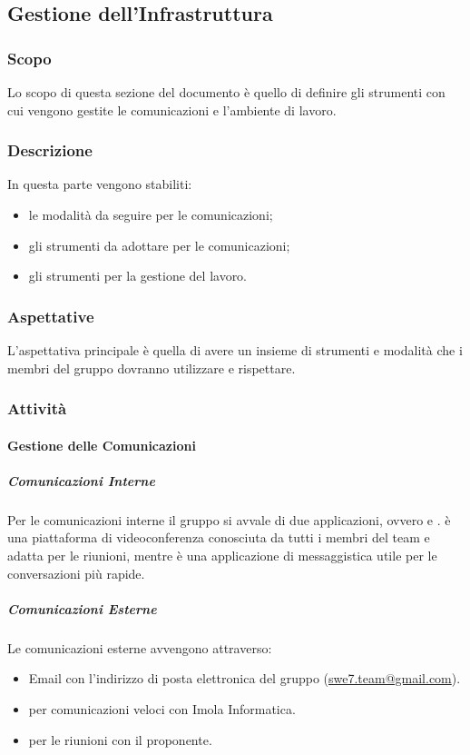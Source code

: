 \subsection{Gestione dell'Infrastruttura}
\subsubsection{Scopo}
Lo scopo di questa sezione del documento è quello di definire gli strumenti con cui vengono gestite le 
comunicazioni e l'ambiente di lavoro.

\subsubsection{Descrizione}
In questa parte vengono stabiliti:
\begin{itemize}
    \item le modalità da seguire per le comunicazioni;
    \item gli strumenti da adottare per le comunicazioni;
    \item gli strumenti per la gestione del lavoro.
\end{itemize}

\subsubsection{Aspettative}
L'aspettativa principale è quella di avere un insieme di strumenti e modalità che i membri del gruppo 
dovranno utilizzare e rispettare.

\subsubsection{Attività}
\paragraph{Gestione delle Comunicazioni} 
\subparagraph*{Comunicazioni Interne} \hfill \break
Per le comunicazioni interne il gruppo si avvale di due applicazioni, ovvero  e 
.  è una piattaforma di videoconferenza conosciuta da tutti i membri del 
team e adatta per le riunioni, mentre  è una applicazione di messaggistica utile per le 
conversazioni più rapide.

\subparagraph*{Comunicazioni Esterne} \hfill \break
Le comunicazioni esterne avvengono attraverso:
\begin{itemize}
    \item Email con l'indirizzo di posta elettronica del gruppo 
        (\href{mailto:swe7.team@gmail.com}{swe7.team@gmail.com}).
    \item {} per comunicazioni veloci con Imola Informatica.
    \item {} per le riunioni con il proponente.
\end{itemize}

